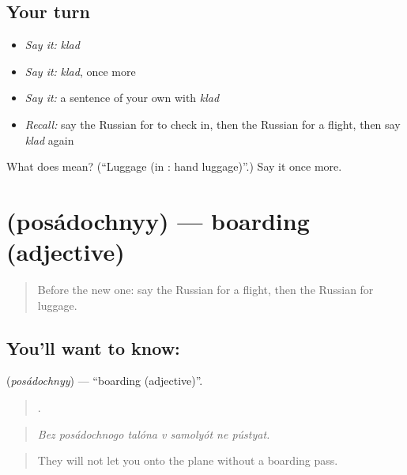 \subsection*{Your turn}
\begin{itemize}
\raggedright
  \item \emph{Say it:} \emph{klad}
  \item \emph{Say it:} \emph{klad}, once more
  \item \emph{Say it:} a sentence of your own with \emph{klad}
  \item \emph{Recall:} say the Russian for to check in, then the Russian for a flight, then say \emph{klad} again
\end{itemize}

\begin{tcolorbox}[breakable,colback=teal!4,colframe=teal!35!black,title={Before you move on}]
What does  mean? (\textquotedblleft{}Luggage (in  : hand luggage)\textquotedblright{}.) Say it once more.
\end{tcolorbox}
\section[\texorpdfstring{\ru{посадочный} (posádochnyy)}{посадочный (posádochnyy)}]{ (posádochnyy) — boarding (adjective)}

\label{lesson:RU-C419-posadochnyy}



\begin{quote}
Before the new one: say the Russian for a flight, then the Russian for luggage.
\end{quote}

\subsection*{You'll want to know: }
\textbf{} (\emph{posádochnyy}) — \textquotedblleft{}boarding (adjective)\textquotedblright{}.

\begin{quote}
      .
\end{quote}

\begin{quote}
\emph{Bez posádochnogo talóna v samolyót ne pústyat.}
\end{quote}

\begin{quote}
They will not let you onto the plane without a boarding pass.
\end{quote}

